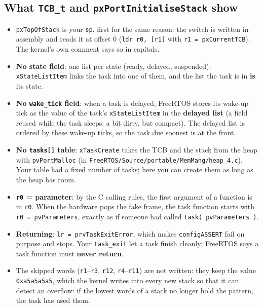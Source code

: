 \subsection{What \texttt{TCB\_t} and \texttt{pxPortInitialiseStack} show}
\begin{itemize}
    \item \texttt{pxTopOfStack} is your \texttt{sp}, first for the same reason: the switch is written in assembly and reads it at offset 0 (\texttt{ldr r0, [r1]} with \texttt{r1 = pxCurrentTCB}). The kernel's own comment says so in capitals.
    \item \textbf{No state field}: one list per state (ready, delayed, suspended); \texttt{xStateListItem} links the task into one of them, and the list the task is in \textbf{is} its state.
    \item \textbf{No \texttt{wake\_tick} field}: when a task is delayed, FreeRTOS stores its wake-up tick as the value of the task's \texttt{xStateListItem} in the \textbf{delayed list} (a field reused while the task sleeps: a bit dirty, but compact). The delayed list is ordered by these wake-up ticks, so the task due soonest is at the front.
    \item \textbf{No \texttt{tasks[]} table}: \texttt{xTaskCreate} takes the TCB and the stack from the heap with \texttt{pvPortMalloc} (in \texttt{FreeRTOS/Source/portable/MemMang/heap\_4.c}). Your table had a fixed number of tasks; here you can create them as long as the heap has room.
    \item \textbf{\texttt{r0} = parameter}: by the C calling rules, the first argument of a function is in \texttt{r0}. When the hardware pops the fake frame, the task function starts with \texttt{r0 = pvParameters}, exactly as if someone had called \texttt{task( pvParameters )}.
    \item \textbf{Returning}: \texttt{lr = prvTaskExitError}, which makes \texttt{configASSERT} fail on purpose and stops. Your \texttt{task\_exit} let a task finish cleanly; FreeRTOS says a task function must \textbf{never return}.
    \item The skipped words (\texttt{r1}--\texttt{r3}, \texttt{r12}, \texttt{r4}--\texttt{r11}) are not written: they keep the value \texttt{0xa5a5a5a5}, which the kernel writes into every new stack so that it can detect an overflow: if the lowest words of a stack no longer hold the pattern, the task has used them.
\end{itemize}

